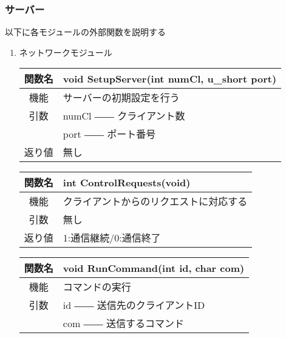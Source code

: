 \documentclass{jarticle}
\begin{document}
\subsubsection{サーバー}

以下に各モジュールの外部関数を説明する
\begin{enumerate}
    \item ネットワークモジュール
    \begin{table}[H]
        \label{table:fanc_s1-1}
        \begin{center}
            \begin{tabular}{|c||p{30em}|}\hline
                関数名&void SetupServer(int numCl, u\_short port)\\\hline
                機能&サーバーの初期設定を行う\\
                引数&numCl ―― クライアント数\\
                &port ―― ポート番号\\
                返り値&無し\\\hline
            \end{tabular}
        \end{center}
    \end{table}
    \begin{table}[H]
        \label{table:fanc_s1-2}
        \begin{center}
            \begin{tabular}{|c||p{30em}|}\hline
                関数名&int ControlRequests(void) \\\hline
                機能&クライアントからのリクエストに対応する\\
                引数&無し\\
                返り値&1:通信継続/0:通信終了\\\hline
            \end{tabular}
        \end{center}
    \end{table}
    \begin{table}[H]
        \label{table:fanc_s1-3}
        \begin{center}
            \begin{tabular}{|c||p{30em}|}\hline
                関数名&void RunCommand(int id, char com) \\\hline
                機能&コマンドの実行\\
                引数&id ―― 送信先のクライアントID\\
                &com ―― 送信するコマンド\\

\end{tabular}
\end{center}
\end{table}
\end{enumerate}
\end{document}
